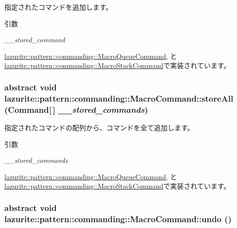 指定されたコマンドを追加します。 
\begin{DoxyParams}{引数}
\item[{\em \_\-\_\-stored\_\-command}]\end{DoxyParams}


\hyperlink{classlazurite_1_1pattern_1_1commanding_1_1_macro_queue_command_a35d54d52f1bfe9dccbd64f0ce9c69585}{lazurite::pattern::commanding::MacroQueueCommand}, と \hyperlink{classlazurite_1_1pattern_1_1commanding_1_1_macro_stack_command_ab18bb77c4756070bdac98a633d80921c}{lazurite::pattern::commanding::MacroStackCommand}で実装されています。\hypertarget{classlazurite_1_1pattern_1_1commanding_1_1_macro_command_afa0d8581adff629f311bd109de0657b5}{
\subsubsection[{storeAll}]{\setlength{\rightskip}{0pt plus 5cm}abstract void lazurite::pattern::commanding::MacroCommand::storeAll ({\bf Command}\mbox{[}$\,$\mbox{]} {\em \_\-\_\-stored\_\-commands})}}
\label{classlazurite_1_1pattern_1_1commanding_1_1_macro_command_afa0d8581adff629f311bd109de0657b5}


指定されたコマンドの配列から、コマンドを全て追加します。 
\begin{DoxyParams}{引数}
\item[{\em \_\-\_\-stored\_\-commands}]\end{DoxyParams}


\hyperlink{classlazurite_1_1pattern_1_1commanding_1_1_macro_queue_command_aa3b1ac137d9b6f16bf2177a4b7804a23}{lazurite::pattern::commanding::MacroQueueCommand}, と \hyperlink{classlazurite_1_1pattern_1_1commanding_1_1_macro_stack_command_a3f201d6f11d36c2609de0c31562268a8}{lazurite::pattern::commanding::MacroStackCommand}で実装されています。\hypertarget{classlazurite_1_1pattern_1_1commanding_1_1_macro_command_ae042e0f0207269ebb1c201ea39b860fb}{
\subsubsection[{undo}]{\setlength{\rightskip}{0pt plus 5cm}abstract void lazurite::pattern::commanding::MacroCommand::undo ()}}
\label{classlazurite_1_1pattern_1_1commanding_1_1_macro_command_ae042e0f0207269ebb1c201ea39b860fb}


